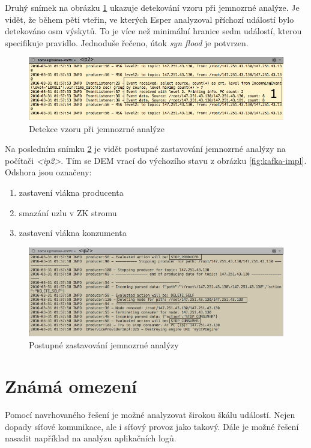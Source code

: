 \documentclass[
  digital, %
  table,   %
  nolof,     %
  nolot,     %
  oneside, %
  nocover,
  monochrome,
  12pt
]{fithesis3}
\begin{document}
Druhý snímek na obrázku \ref{fig:match-pattern-screen} ukazuje detekování vzoru při jemnozrné analýze. Je vidět, že během pěti vteřin, ve kterých Esper analyzoval příchozí událostí bylo detekováno osm výskytů. To je více než minimální hranice sedm událostí, kterou specifikuje pravidlo. Jednoduše řečeno, útok \textit{syn flood} je potvrzen.

\begin{figure}[H]
	\centering
    \includegraphics[width=.9\linewidth, height=.15\textheight]{images/match-pattern-screen.png}
    \caption{Detekce vzoru při jemnozrné analýze}
    \label{fig:match-pattern-screen}
\end{figure}

Na posledním snímku \ref{fig:clean-up-screen} je vidět postupné zastavování jemnozrné analýzy na počítači \textit{<ip2>}. Tím se DEM vrací do výchozího stavu z obrázku \ref{fig:kafka-impl}. Odshora jsou označeny:

\begin{enumerate}
  \item zastavení vlákna producenta
  \item smazání uzlu v ZK stromu
  \item zastavení vlákna konzumenta
\end{enumerate}

\begin{figure}[H]
	\centering
    \includegraphics[width=.8\linewidth, height=.15\textheight]{images/clean-up-screen.png}
    \caption{Postupné zastavování jemnozrné analýzy}
    \label{fig:clean-up-screen}
\end{figure}

\section{Známá omezení}
Pomocí navrhovaného řešení je možné analyzovat širokou škálu událostí. Nejen dopady síťové komunikace, ale i síťový provoz jako takový. Dále je možné řešení nasadit například na analýzu aplikačních logů.
\end{document}

